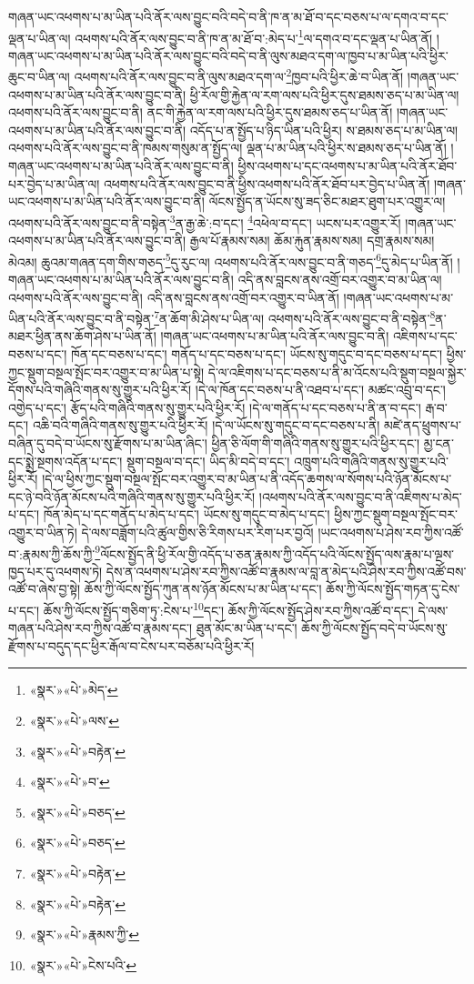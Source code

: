 གཞན་ཡང་འཕགས་པ་མ་ཡིན་པའི་ནོར་ལས་བྱུང་བའི་བདེ་བ་ནི་ཁ་ན་མ་ཐོ་བ་དང་བཅས་པ་ལ་དགའ་བ་དང་ལྡན་པ་ཡིན་ལ། འཕགས་པའི་ནོར་ལས་བྱུང་བ་ནི་ཁ་ན་མ་ཐོ་བ་:མེད་པ་\footnote{«སྣར་»«པེ་»མེད་}ལ་དགའ་བ་དང་ལྡན་པ་ཡིན་ནོ། །གཞན་ཡང་འཕགས་པ་མ་ཡིན་པའི་ནོར་ལས་བྱུང་བའི་བདེ་བ་ནི་ལུས་མཐའ་དག་ལ་ཁྱབ་པ་མ་ཡིན་པའི་ཕྱིར་ཆུང་བ་ཡིན་ལ། འཕགས་པའི་ནོར་ལས་བྱུང་བ་ནི་ལུས་མཐའ་དག་ལ་\footnote{«སྣར་»«པེ་»ལས་}ཁྱབ་པའི་ཕྱིར་ཆེ་བ་ཡིན་ནོ། །གཞན་ཡང་འཕགས་པ་མ་ཡིན་པའི་ནོར་ལས་བྱུང་བ་ནི། ཕྱི་རོལ་གྱི་རྐྱེན་ལ་རག་ལས་པའི་ཕྱིར་དུས་ཐམས་ཅད་པ་མ་ཡིན་ལ། འཕགས་པའི་ནོར་ལས་བྱུང་བ་ནི། ནང་གི་རྐྱེན་ལ་རག་ལས་པའི་ཕྱིར་དུས་ཐམས་ཅད་པ་ཡིན་ནོ། །གཞན་ཡང་འཕགས་པ་མ་ཡིན་པའི་ནོར་ལས་བྱུང་བ་ནི། འདོད་པ་ན་སྤྱོད་པ་ཉིད་ཡིན་པའི་ཕྱིར། ས་ཐམས་ཅད་པ་མ་ཡིན་ལ། འཕགས་པའི་ནོར་ལས་བྱུང་བ་ནི་ཁམས་གསུམ་ན་སྤྱོད་ལ། ལྡན་པ་མ་ཡིན་པའི་ཕྱིར་ས་ཐམས་ཅད་པ་ཡིན་ནོ། །གཞན་ཡང་འཕགས་པ་མ་ཡིན་པའི་ནོར་ལས་བྱུང་བ་ནི། ཕྱིས་འཕགས་པ་དང་འཕགས་པ་མ་ཡིན་པའི་ནོར་ཐོབ་པར་བྱེད་པ་མ་ཡིན་ལ། འཕགས་པའི་ནོར་ལས་བྱུང་བ་ནི་ཕྱིས་འཕགས་པའི་ནོར་ཐོབ་པར་བྱེད་པ་ཡིན་ནོ། །གཞན་ཡང་འཕགས་པ་མ་ཡིན་པའི་ནོར་ལས་བྱུང་བ་ནི། ལོངས་སྤྱོད་ན་ཡོངས་སུ་ཟད་ཅིང་མཐར་ཐུག་པར་འགྱུར་ལ། འཕགས་པའི་ནོར་ལས་བྱུང་བ་ནི་བསྟེན་\footnote{«སྣར་»«པེ་»བརྟེན་}ན་རྒྱ་ཆེ་:བ་དང་། \footnote{«སྣར་»«པེ་»བ་}འཕེལ་བ་དང་། ཡངས་པར་འགྱུར་རོ། །གཞན་ཡང་འཕགས་པ་མ་ཡིན་པའི་ནོར་ལས་བྱུང་བ་ནི། རྒྱལ་པོ་རྣམས་སམ། ཆོམ་རྐུན་རྣམས་སམ། དགྲ་རྣམས་སམ། མེའམ། ཆུའམ་གཞན་དག་གིས་གཅད་\footnote{«སྣར་»«པེ་»བཅད་}དུ་རུང་ལ། འཕགས་པའི་ནོར་ལས་བྱུང་བ་ནི་གཅད་\footnote{«སྣར་»«པེ་»བཅད་}དུ་མེད་པ་ཡིན་ནོ། །གཞན་ཡང་འཕགས་པ་མ་ཡིན་པའི་ནོར་ལས་བྱུང་བ་ནི། འདི་ནས་བླངས་ནས་འགྲོ་བར་འགྱུར་བ་མ་ཡིན་ལ། འཕགས་པའི་ནོར་ལས་བྱུང་བ་ནི། འདི་ནས་བླངས་ནས་འགྲོ་བར་འགྱུར་བ་ཡིན་ནོ། །གཞན་ཡང་འཕགས་པ་མ་ཡིན་པའི་ནོར་ལས་བྱུང་བ་ནི་བསྟེན་\footnote{«སྣར་»«པེ་»བརྟེན་}ན་ཆོག་མི་ཤེས་པ་ཡིན་ལ། འཕགས་པའི་ནོར་ལས་བྱུང་བ་ནི་བསྟེན་\footnote{«སྣར་»«པེ་»བརྟེན་}ན་མཐར་ཕྱིན་ནས་ཆོག་ཤེས་པ་ཡིན་ནོ། །གཞན་ཡང་འཕགས་པ་མ་ཡིན་པའི་ནོར་ལས་བྱུང་བ་ནི། འཇིགས་པ་དང་བཅས་པ་དང་། ཁོན་དང་བཅས་པ་དང་། གནོད་པ་དང་བཅས་པ་དང་། ཡོངས་སུ་གདུང་བ་དང་བཅས་པ་དང་། ཕྱིས་ཀྱང་སྡུག་བསྔལ་སྤོང་བར་འགྱུར་བ་མ་ཡིན་པ་སྟེ། དེ་ལ་འཇིགས་པ་དང་བཅས་པ་ནི་མ་འོངས་པའི་སྡུག་བསྔལ་སྐྱེར་དོགས་པའི་གཞིའི་གནས་སུ་གྱུར་པའི་ཕྱིར་རོ། །དེ་ལ་ཁོན་དང་བཅས་པ་ནི་འཐབ་པ་དང་། མཚང་འབྲུ་བ་དང་། འགྱེད་པ་དང་། རྩོད་པའི་གཞིའི་གནས་སུ་གྱུར་པའི་ཕྱིར་རོ། །དེ་ལ་གནོད་པ་དང་བཅས་པ་ནི་ན་བ་དང་། རྒ་བ་དང་། འཆི་བའི་གཞིའི་གནས་སུ་གྱུར་པའི་ཕྱིར་རོ། །དེ་ལ་ཡོངས་སུ་གདུང་བ་དང་བཅས་པ་ནི། མཛེ་ནད་ཕྲུགས་པ་བཞིན་དུ་བདེ་བ་ཡོངས་སུ་རྫོགས་པ་མ་ཡིན་ཞིང་། ཕྱིན་ཅི་ལོག་གི་གཞིའི་གནས་སུ་གྱུར་པའི་ཕྱིར་དང་། མྱ་ངན་དང་སྨྲེ་སྔགས་འདོན་པ་དང་། སྡུག་བསྔལ་བ་དང་། ཡིད་མི་བདེ་བ་དང་། འཁྲུག་པའི་གཞིའི་གནས་སུ་གྱུར་པའི་ཕྱིར་རོ། །དེ་ལ་ཕྱིས་ཀྱང་སྡུག་བསྔལ་སྤོང་བར་འགྱུར་བ་མ་ཡིན་པ་ནི་འདོད་ཆགས་ལ་སོགས་པའི་ཉོན་མོངས་པ་དང་ཉེ་བའི་ཉོན་མོངས་པའི་གཞིའི་གནས་སུ་གྱུར་པའི་ཕྱིར་རོ། །འཕགས་པའི་ནོར་ལས་བྱུང་བ་ནི་འཇིགས་པ་མེད་པ་དང་། ཁོན་མེད་པ་དང་གནོད་པ་མེད་པ་དང་། ཡོངས་སུ་གདུང་བ་མེད་པ་དང་། ཕྱིས་ཀྱང་སྡུག་བསྔལ་སྤོང་བར་འགྱུར་བ་ཡིན་ཏེ། དེ་ལས་བཟློག་པའི་ཚུལ་གྱིས་ཅི་རིགས་པར་རིག་པར་བྱའོ། །ཡང་འཕགས་པ་ཤེས་རབ་ཀྱིས་འཚོ་བ་:རྣམས་ཀྱི་ཆོས་ཀྱི་\footnote{«སྣར་»«པེ་»རྣམས་ཀྱི་}ལོངས་སྤྱོད་ནི་ཕྱི་རོལ་གྱི་འདོད་པ་ཅན་རྣམས་ཀྱི་འདོད་པའི་ལོངས་སྤྱོད་ལས་རྣམ་པ་ལྔས་ཁྱད་པར་དུ་འཕགས་ཏེ། དེས་ན་འཕགས་པ་ཤེས་རབ་ཀྱིས་འཚོ་བ་རྣམས་ལ་བླ་ན་མེད་པའི་ཤེས་རབ་ཀྱིས་འཚོ་བས་འཚོ་བ་ཞེས་བྱ་སྟེ། ཆོས་ཀྱི་ལོངས་སྤྱོད་ཀུན་ནས་ཉོན་མོངས་པ་མ་ཡིན་པ་དང་། ཆོས་ཀྱི་ལོངས་སྤྱོད་གཏན་དུ་ངེས་པ་དང་། ཆོས་ཀྱི་ལོངས་སྤྱོད་གཅིག་ཏུ་:ངེས་པ་\footnote{«སྣར་»«པེ་»ངེས་པའི་}དང་། ཆོས་ཀྱི་ལོངས་སྤྱོད་ཤེས་རབ་ཀྱིས་འཚོ་བ་དང་། དེ་ལས་གཞན་པའི་ཤེས་རབ་ཀྱིས་འཚོ་བ་རྣམས་དང་། ཐུན་མོང་མ་ཡིན་པ་དང་། ཆོས་ཀྱི་ལོངས་སྤྱོད་བདེ་བ་ཡོངས་སུ་རྫོགས་པ་བདུད་དང་ཕྱིར་རྒོལ་བ་ངེས་པར་བཅོམ་པའི་ཕྱིར་རོ། 